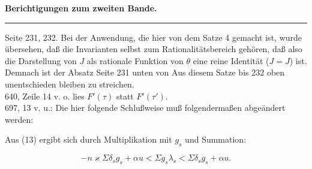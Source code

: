 \begin{center}
\textbf{Berichtigungen zum zweiten Bande.}
\end{center}

\begin{center}
\rule{3cm}{0.4pt}
\end{center}

\bigskip
\noindent Seite 231, 232. Bei der Anwendung, die hier von dem Satze 4 gemacht ist,
wurde übersehen, daß die Invarianten selbst zum Rationalitätsbereich
 gehören, daß also die Darstellung von $J$ als rationale
Funktion von $\theta$ eine reine Identität ($J = J$) ist. Demnach ist
der Absatz Seite 231 unten von \glqq Aus diesem Satze\grqq{} bis 232 oben
\glqq unentschieden bleiben\grqq{} zu streichen.\\
\glqq{} 640, Zeile 14 v. o. lies $F'(\tau)$ statt $F'(\tau')$.\\
\glqq{} 697, \glqq{} 13 v. u.: Die hier folgende Schlußweise muß folgendermaßen
abgeändert werden:

\bigskip
\noindent Aus (13) ergibt sich durch Multiplikation mit $g_s$ und Summation:

\[
-n\varkappa \Sigma \delta_s g_s + \alpha u < \Sigma g_s \lambda_s < \Sigma \delta_s g_s + \alpha u.
\]
